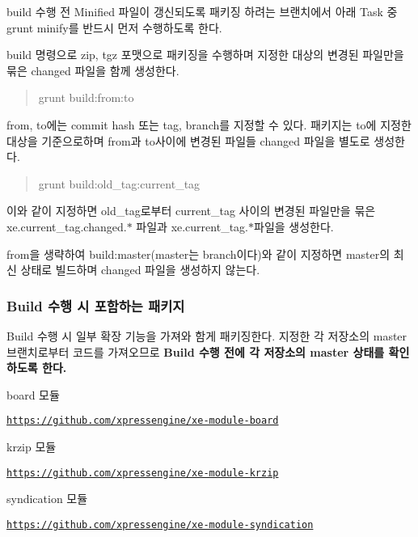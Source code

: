 build 수행 전 Minified 파일이 갱신되도록 패키징 하려는 브랜치에서 아래 Task 중 {\ttfamily grunt minify}를 반드시 먼저 수행하도록 한다.

build 명령으로 zip, tgz 포맷으로 패키징을 수행하며 지정한 대상의 변경된 파일만을 묶은 changed 파일을 함께 생성한다.

\begin{quote}
grunt build{\ttfamily \+:from}\+:{\ttfamily to} \end{quote}


{\ttfamily from}, {\ttfamily to}에는 commit hash 또는 tag, branch를 지정할 수 있다. 패키지는 {\ttfamily to}에 지정한 대상을 기준으로하며 {\ttfamily from}과 {\ttfamily to}사이에 변경된 파일들 changed 파일을 별도로 생성한다.

\begin{quote}
grunt build\+:{\ttfamily old\+\_\+tag}\+:{\ttfamily current\+\_\+tag} \end{quote}


이와 같이 지정하면 {\ttfamily old\+\_\+tag}로부터 {\ttfamily current\+\_\+tag} 사이의 변경된 파일만을 묶은 {\ttfamily xe.\+current\+\_\+tag.\+changed.$\ast$} 파일과 {\ttfamily xe.\+current\+\_\+tag.$\ast$}파일을 생성한다.

{\ttfamily from}을 생략하여 {\ttfamily build\+:master}(master는 branch이다)와 같이 지정하면 {\ttfamily master}의 최신 상태로 빌드하며 changed 파일을 생성하지 않는다.

\subsubsection*{Build 수행 시 포함하는 패키지}

Build 수행 시 일부 확장 기능을 가져와 함게 패키징한다. 지정한 각 저장소의 master 브랜치로부터 코드를 가져오므로 {\bfseries Build 수행 전에 각 저장소의 master 상태를 확인하도록 한다.}


\begin{DoxyItemize}
\item board 모듈
\begin{DoxyItemize}
\item \href{https://github.com/xpressengine/xe-module-board}{\tt https\+://github.\+com/xpressengine/xe-\/module-\/board}
\end{DoxyItemize}
\item krzip 모듈
\begin{DoxyItemize}
\item \href{https://github.com/xpressengine/xe-module-krzip}{\tt https\+://github.\+com/xpressengine/xe-\/module-\/krzip}
\end{DoxyItemize}
\item syndication 모듈
\begin{DoxyItemize}
\item \href{https://github.com/xpressengine/xe-module-syndication}{\tt https\+://github.\+com/xpressengine/xe-\/module-\/syndication}
\end{DoxyItemize}
\end{DoxyItemize}

